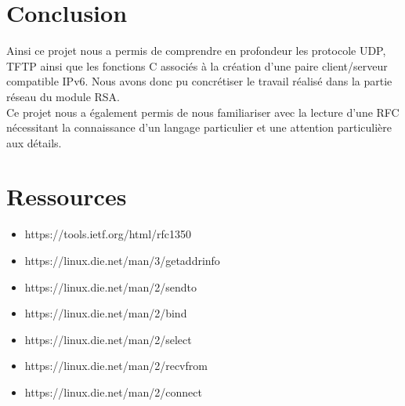 \documentclass{article}
\begin{document}
\clearpage

\section{Conclusion}
     
    Ainsi ce projet nous a permis de comprendre en profondeur les protocole UDP, TFTP ainsi que les fonctions C associés à la création d'une paire client/serveur compatible IPv6. Nous avons donc pu concrétiser le travail réalisé dans la partie réseau du module RSA.\\
    Ce projet nous a également permis de nous familiariser avec la lecture d'une RFC nécessitant la connaissance d'un langage particulier et une attention particulière aux détails.
    

    
\section{Ressources}

    \begin{itemize}
        \item https://tools.ietf.org/html/rfc1350
        \item https://linux.die.net/man/3/getaddrinfo
        \item https://linux.die.net/man/2/sendto
        \item https://linux.die.net/man/2/bind
        \item https://linux.die.net/man/2/select
        \item https://linux.die.net/man/2/recvfrom
        \item https://linux.die.net/man/2/connect
        
    \end{itemize}
    
\end{document}
